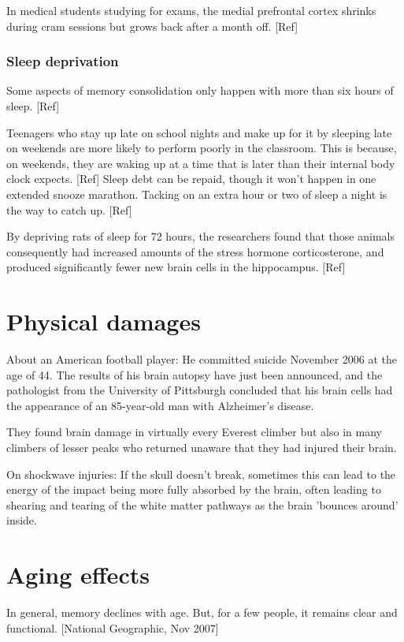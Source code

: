 \documentclass[oneside, article]{memoir}
\begin{document}
In medical students studying for exams, the medial prefrontal cortex shrinks during cram sessions but grows back after a month off. [Ref]

\subsubsection{Sleep deprivation}
Some aspects of memory consolidation only happen with more than six hours of sleep. [Ref]

Teenagers who stay up late on school nights and make up for it by sleeping late on weekends are more likely to perform poorly in the classroom. This is because, on weekends, they are waking up at a time that is later than their internal body clock expects. [Ref] Sleep debt can be repaid, though it won't happen in one extended snooze marathon. Tacking on an extra hour or two of sleep a night is the way to catch up. [Ref]

By depriving rats of sleep for 72 hours, the researchers found that those animals consequently had increased amounts of the stress hormone corticosterone, and produced significantly fewer new brain cells in the hippocampus. [Ref]



\section{Physical damages}
About an American football player: He committed suicide November 2006 at the age of 44. The results of his brain autopsy have just been announced, and the pathologist from the University of Pittsburgh concluded that his brain cells had the appearance of an 85-year-old man with Alzheimer's disease.

They found brain damage in virtually every Everest climber but also in many climbers of lesser peaks who returned unaware that they had injured their brain.

On shockwave injuries: If the skull doesn't break, sometimes this can lead to the energy of the impact being more fully absorbed by the brain, often leading to shearing and tearing of the white matter pathways as the brain 'bounces around' inside.

\section{Aging effects}
In general, memory declines with age. But, for a few people, it remains clear and functional. [National Geographic, Nov 2007]
\end{document}
